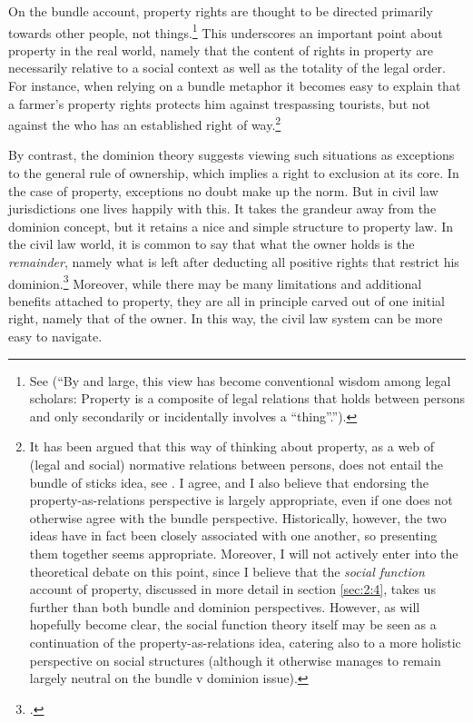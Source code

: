 On the bundle account, property rights are thought to be directed primarily towards other people, not things.\footnote{See \cite[357-358]{merrill01} (``By and large, this view has become conventional wisdom among legal scholars: Property is a composite of legal relations that holds between persons and only secondarily or incidentally involves a ``thing''.'').} This underscores an important point about property in the real world, namely that the content of rights in property are necessarily relative to a social context as well as the totality of the legal order. For instance, when relying on a bundle metaphor it becomes easy to explain that a farmer's property rights protects him against trespassing tourists, but not against the  who has an established right of way.\footnote{It has been argued that this way of thinking about property, as a web of (legal and social) normative relations between persons, does not entail the bundle of sticks idea, see \cite[23-25]{dorfman10}. I agree, and I also believe that endorsing the property-as-relations perspective is largely appropriate, even if one does not otherwise agree with the bundle perspective. Historically, however, the two ideas have in fact been closely associated with one another, so presenting them together seems appropriate. Moreover, I will not actively enter into the theoretical debate on this point, since I believe that the {\it social function} account of property, discussed in more detail in section \ref{sec:2:4}, takes us further than both bundle and dominion perspectives. However, as will hopefully become clear, the social function theory itself may be seen as a continuation of the property-as-relations idea, catering also to a more holistic perspective on social structures (although it otherwise manages to remain largely neutral on the bundle v dominion issue).}

By contrast, the dominion theory suggests viewing such situations as exceptions to the general rule of ownership, which implies a right to exclusion at its core. In the case of property, exceptions no doubt make up the norm. But in civil law jurisdictions one lives happily with this. It takes the grandeur away from the dominion concept, but it retains a nice and simple structure to property law. In the civil law world, it is common to say that what the owner holds is the {\it remainder}, namely what is left after deducting all positive rights that restrict his dominion.\footcite[25]{chang12} Moreover, while there may be many limitations and additional benefits attached to property, they are all in principle carved out of one initial right, namely that of the owner. In this way, the civil law system can be more easy to navigate.

